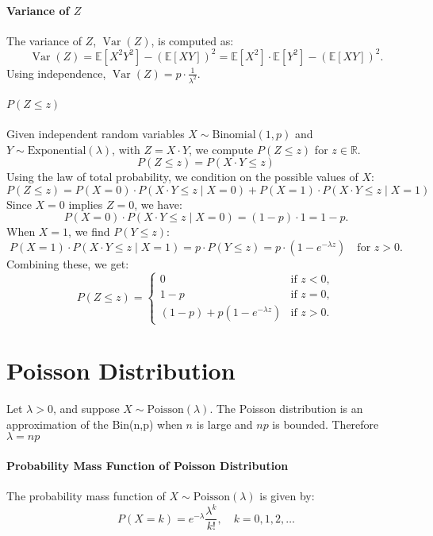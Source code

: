 \paragraph{Variance of \( Z \)}
The variance of \( Z \), \( \operatorname{Var}(Z) \), is computed as:
\[
\operatorname{Var}(Z) = \mathbb{E}[X^2Y^2] - (\mathbb{E}[XY])^2 = \mathbb{E}[X^2]\cdot \mathbb{E}[Y^2] - (\mathbb{E}[XY])^2.
\]
Using independence, \( \operatorname{Var}(Z) = p \cdot \frac{1}{\lambda^2} \).

\paragraph{\( P(Z \leq z) \)}
Given independent random variables \( X \sim \text{Binomial}(1, p) \) and \( Y \sim \text{Exponential}(\lambda) \), with \( Z = X \cdot Y \), we compute \( P(Z \leq z) \) for \( z \in \mathbb{R} \).
\[
P(Z \leq z) = P(X \cdot Y \leq z)
\]
Using the law of total probability, we condition on the possible values of \( X \):
\[
P(Z \leq z) = P(X = 0) \cdot P(X \cdot Y \leq z \mid X = 0) + P(X = 1) \cdot P(X \cdot Y \leq z \mid X = 1)
\]
Since \( X = 0 \) implies \( Z = 0 \), we have:
\[
P(X = 0) \cdot P(X \cdot Y \leq z \mid X = 0) = (1 - p) \cdot 1 = 1 - p.
\]
When \( X = 1 \), we find \( P(Y \leq z) \):
\[
P(X = 1) \cdot P(X \cdot Y \leq z \mid X = 1) = p \cdot P(Y \leq z) = p \cdot (1 - e^{-\lambda z}) \quad \text{for } z > 0.
\]
Combining these, we get:
\[
P(Z \leq z) = \begin{cases} 
0 & \text{if } z < 0, \\
1 - p & \text{if } z = 0, \\ 
(1 - p) + p(1 - e^{-\lambda z}) & \text{if } z > 0.
\end{cases}
\]

\section{Poisson Distribution}
Let \( \lambda > 0 \), and suppose \( X \sim \text{Poisson}(\lambda) \). The Poisson distribution is an approximation of the Bin(n,p) when \( n \) is large and \( np \) is bounded. Therefore $\lambda=np$

\paragraph{Probability Mass Function of Poisson Distribution}
The probability mass function of \( X \sim \text{Poisson}(\lambda) \) is given by:
\[
P(X = k) = e^{-\lambda} \frac{\lambda^k}{k!}, \quad k = 0, 1, 2, \dots
\]

